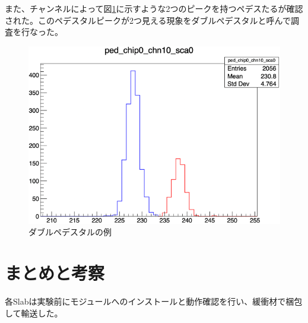 また、チャンネルによって図\ref{dp}に示すような2つのピークを持つペデスたるが確認された。このペデスタルピークが2つ見える現象をダブルぺデスタルと呼んで調査を行なった。
\begin{figure}[H]
\begin{center}
 \includegraphics[keepaspectratio, scale=0.5]
 	{Figure/Beamtest/dp.png}
 		\caption{ダブルペデスタルの例}
		\label{dp}
\end{center}
\end{figure}
\section{まとめと考察}
各Slabは実験前にモジュールへのインストールと動作確認を行い、緩衝材で梱包して輸送した。